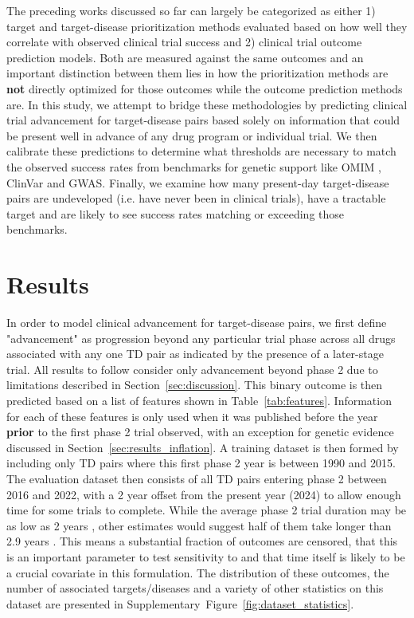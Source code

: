 \documentclass{article}
\begin{document}
The preceding works discussed so far can largely be categorized as either 1) target and target-disease prioritization methods evaluated based on how well they correlate with observed clinical trial success and 2) clinical trial outcome prediction models. Both are measured against the same outcomes and an important distinction between them lies in how the prioritization methods are {\bf not} directly optimized for those outcomes while the outcome prediction methods are. In this study, we attempt to bridge these methodologies by predicting clinical trial advancement for target-disease pairs based solely on information that could be present well in advance of any drug program or individual trial. We then calibrate these predictions to determine what thresholds are necessary to match the observed success rates from benchmarks for genetic support like OMIM \cite{PMID:15608251}, ClinVar \cite{PMID:24234437} and GWAS. Finally, we examine how many present-day target-disease pairs are undeveloped (i.e. have never been in clinical trials), have a tractable target and are likely to see success rates matching or exceeding those benchmarks.

\section{Results}
\label{sec:results}

In order to model clinical advancement for target-disease pairs, we first define "advancement" as progression beyond any particular trial phase across all drugs associated with any one TD pair as indicated by the presence of a later-stage trial. All results to follow consider only advancement beyond phase 2 due to limitations described in Section~\ref{sec:discussion}. This binary outcome is then predicted based on a list of features shown in Table~\ref{tab:features}. Information for each of these features is only used when it was published before the year \textbf{prior} to the first phase 2 trial observed, with an exception for genetic evidence discussed in Section~\ref{sec:results_inflation}. A training dataset is then formed by including only TD pairs where this first phase 2 year is between 1990 and 2015. The evaluation dataset then consists of all TD pairs entering phase 2 between 2016 and 2022, with a 2 year offset from the present year (2024) to allow enough time for some trials to complete. While the average phase 2 trial duration may be as low as 2 years \cite{fdaStepClinical}, other estimates would suggest half of them take longer than 2.9 years \cite{PMID:29394327}. This means a substantial fraction of outcomes are censored, that this is an important parameter to test sensitivity to and that time itself is likely to be a crucial covariate in this formulation. The distribution of these outcomes, the number of associated targets/diseases and a variety of other statistics on this dataset are presented in Supplementary~Figure~\ref{fig:dataset_statistics}.
\end{document}
